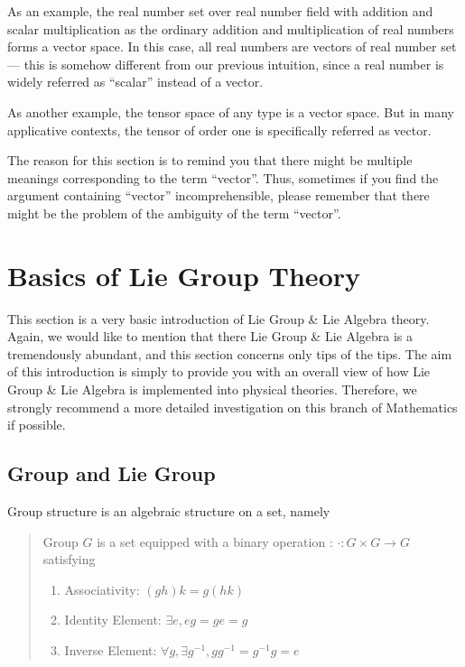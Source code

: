 \documentclass[letterpaper,10pt,english]{sphinxmanual}
\begin{document}
As an example, the real number set over real number field with addition and scalar multiplication as the ordinary addition and multiplication of real numbers forms a vector space. In this case, all real numbers are vectors of real number set --- this is somehow different from our previous intuition, since a real number is widely referred as ``scalar'' instead of a vector.

As another example, the tensor space of any type is a vector space. But in many applicative contexts, the tensor of order one is specifically referred as vector.

The reason for this section is to remind you that there might be multiple meanings corresponding to the term ``vector''. Thus, sometimes if you find the argument containing ``vector'' incomprehensible, please remember that there might be the problem of the ambiguity of the term ``vector''.


\section{Basics of Lie Group Theory}
\label{\detokenize{bg_liegp::doc}}\label{\detokenize{bg_liegp:basics-of-lie-group-theory}}
This section is a very basic introduction of Lie Group \& Lie Algebra theory. Again, we would like to mention that there Lie Group \& Lie Algebra is a tremendously abundant, and this section concerns only tips of the tips. The aim of this introduction is simply to provide you with an overall view of how Lie Group \& Lie Algebra is implemented into physical theories. Therefore, we strongly recommend a more detailed investigation on this branch of Mathematics if possible.


\subsection{Group and Lie Group}
\label{\detokenize{bg_liegp:group-and-lie-group}}
Group structure is an algebraic structure on a set, namely
\begin{quote}

 Group \(G\) is a set equipped with a binary operation : \(\cdot: G\times G\rightarrow G\) satisfying
\begin{enumerate}
\item {} 
Associativity: \((gh)k = g(hk)\)

\item {} 
Identity Element: \(\exists e, eg = ge = g\)

\item {} 
Inverse Element: \(\forall g, \exists g^{-1}, gg^{-1} = g^{-1}g =e\)

\end{enumerate}
\end{quote}
\end{document}
